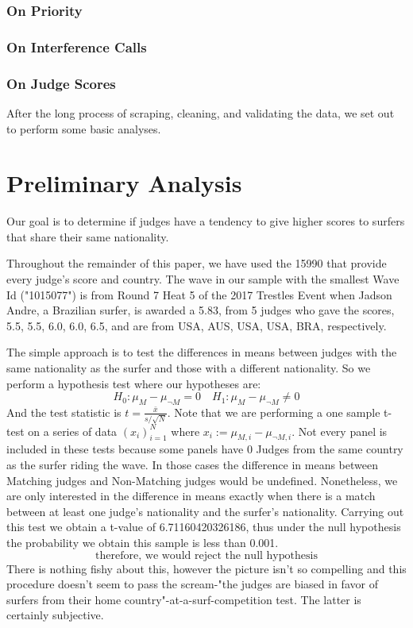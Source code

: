 \documentclass{article}
\begin{document}
\subsubsection{On Priority}
\subsubsection{On Interference Calls}
\subsubsection{On Judge Scores}

After the long process of scraping, cleaning, and validating the data, we set out to perform some basic analyses.

\section{Preliminary Analysis}
Our goal is to determine if judges have a tendency to give higher scores to surfers that share their same nationality.

Throughout the remainder of this paper, we have used the 15990 that provide every judge's score and country. The wave in our sample with the smallest Wave Id ("1015077") is from Round 7 Heat 5 of the 2017 Trestles Event when Jadson Andre, a Brazilian surfer, is awarded a 5.83, from 5 judges who gave the scores, 5.5, 5.5, 6.0, 6.0, 6.5, and are from USA, AUS, USA, USA, BRA, respectively.

The simple approach is to test the differences in means between judges with the same nationality as the surfer and those with a different nationality. So we perform a hypothesis test where our hypotheses are:
\[ H_0: \mu_M  - \mu_{\neg M} = 0  \quad H_1: \mu_M -\mu_{\neg M} \neq 0 \]
And the test statistic is $ t = \frac{\bar{x}}{s/\sqrt{N}} $. Note that we are performing a one sample t-test on a series of data $(x_i)_{i=1}^N$ where $x_i := \mu_{M,i}  - \mu_{\neg M,i}$.  Not every panel is included in these tests because some panels have 0 Judges from the same country as the surfer riding the wave. In those cases the difference in means between Matching judges and Non-Matching judges would be undefined. Nonetheless, we are only interested in the difference in means exactly when there is a match between at least one judge's nationality and the surfer's nationality. Carrying out this test we obtain a t-value of 6.71160420326186, thus under the null hypothesis the probability we obtain this sample is less than 0.001. 
\[\text{therefore, we would reject the null hypothesis}\]
There is nothing fishy about this, however the picture isn't so compelling and this procedure doesn't seem to pass the scream-"the judges are biased in favor of surfers from their home country"-at-a-surf-competition test. The latter is certainly subjective.
\end{document}
